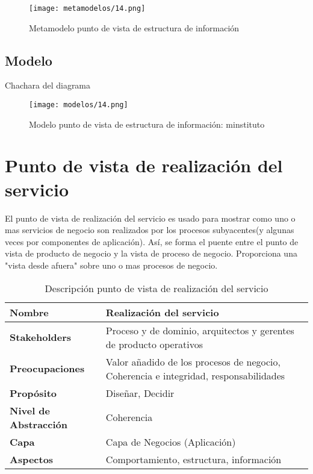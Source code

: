     \begin{figure}[!h]
    	\centering
    	\texttt{[image: metamodelos/14.png]}
    	\captionsetup{width=.95\textwidth}
    	\caption{Metamodelo punto de vista de estructura de información}
    	\label{metamodelo14}
    \end{figure}
    
    \subsection{Modelo}Chachara del diagrama
    \begin{figure}[!h]
    	\centering
    	\texttt{[image: modelos/14.png]}
    	\captionsetup{width=.95\textwidth}
    	\caption{Modelo punto de vista de estructura de información: minstituto}
    	\label{modelo14}
    \end{figure}
    
\section{Punto de vista de realización del servicio}
El punto de vista de realización del servicio es usado para mostrar como uno o mas servicios de negocio son realizados por los procesos subyacentes(y algunas veces por componentes de aplicación). Así, se forma el puente entre el punto de vista de producto de negocio y la vista de proceso de negocio. Proporciona una "vista desde afuera" sobre uno o mas procesos de negocio.
    
    \begin{table}[!h]
    	\centering
    	\begin{tabular}{lp{8cm}}
    		\toprule
    		\textbf{Nombre} & \textbf{Realización del servicio} \\
    		\midrule
    		\textbf{Stakeholders} & Proceso y de dominio, arquitectos y gerentes de producto operativos \\
    		\textbf{Preocupaciones} & Valor añadido de los procesos de negocio, Coherencia e integridad,
    		responsabilidades \\
    		\textbf{Propósito} & Diseñar, Decidir \\
    		\textbf{Nivel de Abstracción} & Coherencia \\
    		\textbf{Capa} & Capa de Negocios (Aplicación) \\
    		\textbf{Aspectos} & Comportamiento, estructura, información \\
    		\bottomrule
    	\end{tabular}
    	\captionsetup{width=.95\textwidth}
    	\caption{Descripción punto de vista de realización del servicio}
    	\label{tabla18}
    \end{table}
    
